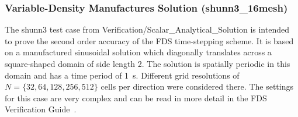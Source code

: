 

\subsubsection{Variable-Density Manufactures Solution ({\ct shunn3\_16mesh})}

The {\ct shunn3} test case from Verification/Scalar\_Analytical\_Solution is intended to prove the second order accuracy of the FDS time-stepping scheme. It is based on a manufactured sinusoidal solution which diagonally translates across a square-shaped domain of side length 2. The solution is spatially periodic in this domain and has a time period of 1~s. 
Different grid resolutions of  $N = \{32, 64, 128, 256, 512\}$ cells per direction were considered there. 
The settings for this case are very complex and can be read in more detail in the FDS Verification Guide~\cite{McGrattan:2018:VG}.

